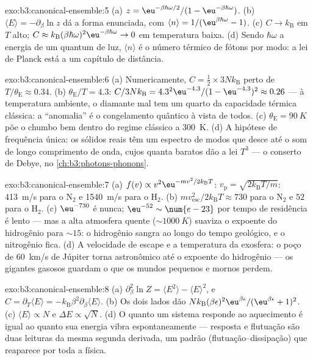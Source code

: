 \begin{solution}{exo:b3:canonical-ensemble:5}
(a) $z = \eu^{-\beta\hbar\omega/2}/(1 - \eu^{-\beta\hbar\omega})$.
(b) $\langle E\rangle = -\partial_\beta\ln z$ dá a forma enunciada, com
$\langle n\rangle = 1/(\eu^{\beta\hbar\omega} - 1)$. (c)
$C \to k_{\text{B}}$ em $T$ alto; $C \approx k_{\text{B}}(\beta
\hbar\omega)^2\eu^{-\beta\hbar\omega} \to 0$ em temperatura baixa. (d) Sendo
$\hbar\omega$ a energia de um quantum de luz, $\langle n\rangle$ é o
número térmico de fótons por modo: a lei de Planck está a um capítulo
de distância.
\end{solution}

\begin{solution}{exo:b3:canonical-ensemble:6}
(a) Numericamente, $C = \tfrac12 \times 3Nk_{\text{B}}$ perto de
$T/\theta_{\text{E}} \approx 0.34$. (b) $\theta_{\text{E}}/T =
4.3$: $C/3Nk_{\text{B}} = 4.3^2\eu^{-4.3}/(1 - \eu^{-4.3})^2
\approx 0.26$ --- à temperatura ambiente, o diamante mal tem um quarto
da capacidade térmica clássica: a ``anomalia'' é o congelamento
quântico à vista de todos. (c) $\theta_{\text{E}} = \qty{90}{K}$ põe o
chumbo bem dentro do regime clássico a \qty{300}{K}. (d) A hipótese de
frequência única: os sólidos reais têm um espectro de modos que desce
até o som de longo comprimento de onda, cujos quanta baratos dão a lei
$T^3$ --- o conserto de Debye, no \cref{ch:b3:photons-phonons}.
\end{solution}

\begin{solution}{exo:b3:canonical-ensemble:7}
(a) $f(v) \propto v^2\eu^{-mv^2/2k_{\text{B}}T}$: $v_{\text{p}} =
\sqrt{2k_{\text{B}}T/m}$: \qty{413}{m/s} para o N$_2$ e
\qty{1540}{m/s} para o H$_2$. (b) $mv_{\text{esc}}^2/2k_{\text{B}}T
\approx 730$ para o N$_2$ e $52$ para o H$_2$. (c) $\eu^{-730}$ é
nunca; $\eu^{-52} \sim \num{e-23}$ por tempo de residência é lento ---
mas a alta atmosfera quente ($\sim\qty{1000}{K}$) suaviza o expoente do
hidrogênio para $\sim15$: o hidrogênio sangra ao longo do tempo
geológico, e o nitrogênio fica. (d) A velocidade de escape e a
temperatura da exosfera: o poço de \qty{60}{km/s} de Júpiter torna
astronômico até o expoente do hidrogênio --- os gigantes gasosos
guardam o que os mundos pequenos e mornos perdem.
\end{solution}

\begin{solution}{exo:b3:canonical-ensemble:8}
(a) $\partial_\beta^2\ln Z = \langle E^2\rangle - \langle
E\rangle^2$, e $C = \partial_T\langle E\rangle =
-k_{\text{B}}\beta^2\partial_\beta\langle E\rangle$. (b) Os dois lados
dão $Nk_{\text{B}}(\beta\epsilon)^2\eu^{\beta\epsilon}/(
\eu^{\beta\epsilon} + 1)^2$. (c) $\langle E\rangle \propto N$ e
$\Delta E \propto \sqrt N$. (d) O quanto um sistema responde ao
aquecimento é igual ao quanto sua energia vibra espontaneamente ---
resposta e flutuação são duas leituras da mesma segunda derivada, um
padrão (flutuação--dissipação) que reaparece por toda a física.
\end{solution}

